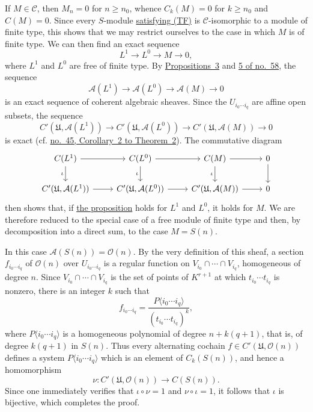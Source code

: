 If $M\in\mathcal{C}$, then $M_n=0$ for $n\geq n_0$, whence
$C_k(M)=0$ for $k\geq n_0$ and $C(M)=0$. Since every $S$-module
\hyperref[fac:III:2:no:56:def:TF]{satisfying (TF)} is
$\mathcal{C}$-isomorphic to a module of finite type,
this shows that we may restrict ourselves to the case in which $M$ is of
finite type. We can then find an exact sequence
\[
L^1\longrightarrow L^0\longrightarrow M\longrightarrow0,
\]
where $L^1$ and $L^0$ are free of finite type. By
\hyperref[fac:III:2:no:58:prop:3]{Propositions~3} and
\hyperref[fac:III:2:no:58:prop:5]{5 of no.~58}, the sequence
\label{fac:III:3:no:64:formula:sheaf-exact}
\[
\mathcal{A}(L^1)\longrightarrow\mathcal{A}(L^0)
\longrightarrow\mathcal{A}(M)\longrightarrow0
\]
is an exact sequence of coherent algebraic sheaves. Since the
$U_{i_0\cdots i_q}$ are affine open subsets, the sequence
\label{fac:III:3:no:64:formula:cochain-exact}
\[
C'(\mathfrak{U},\mathcal{A}(L^1))
\longrightarrow C'(\mathfrak{U},\mathcal{A}(L^0))
\longrightarrow C'(\mathfrak{U},\mathcal{A}(M))
\longrightarrow0
\]
is exact (cf.
\hyperref[fac:II:3:no:45:thm:2:cor:2]{no.~45, Corollary~2 to Theorem~2}).
The commutative diagram
\label{fac:III:3:no:64:diagram:iota}
\[
\begin{tikzcd}
C(L^1) \arrow[r] \arrow[d,"\iota"']
  & C(L^0) \arrow[r] \arrow[d,"\iota"']
  & C(M) \arrow[r] \arrow[d,"\iota"'] & 0 \arrow[d] \\
C'(\mathfrak{U},\mathcal{A}(L^1)) \arrow[r]
  & C'(\mathfrak{U},\mathcal{A}(L^0)) \arrow[r]
  & C'(\mathfrak{U},\mathcal{A}(M)) \arrow[r] & 0
\end{tikzcd}
\]
then shows that, if \hyperref[fac:III:3:no:64:prop:4]{the proposition}
holds for $L^1$ and $L^0$, it holds
for $M$. We are therefore reduced to the special case of a free module of
finite type and then, by decomposition into a direct sum, to the case
$M=S(n)$.

In this case $\mathcal{A}(S(n))=\mathcal{O}(n)$. By the very definition
of this sheaf, a section $f_{i_0\cdots i_q}$ of $\mathcal{O}(n)$ over
$U_{i_0\cdots i_q}$ is a regular function on
$V_{i_0}\cap\cdots\cap V_{i_q}$, homogeneous of degree $n$. Since
$V_{i_0}\cap\cdots\cap V_{i_q}$ is the set of points of $K^{r+1}$ at
which $t_{i_0}\cdots t_{i_q}$ is nonzero, there is an integer $k$ such
that
\label{fac:III:3:no:64:formula:fraction}
\[
f_{i_0\cdots i_q}
=\frac{P\langle i_0\cdots i_q\rangle}
       {(t_{i_0}\cdots t_{i_q})^k},
\]
where $P\langle i_0\cdots i_q\rangle$ is a homogeneous polynomial of
degree $n+k(q+1)$, that is, of degree $k(q+1)$ in $S(n)$. Thus every
alternating cochain
$f\in C'(\mathfrak{U},\mathcal{O}(n))$ defines a system
$P\langle i_0\cdots i_q\rangle$ which is an element of $C_k(S(n))$,
and hence a homomorphism
\label{fac:III:3:no:64:map:nu}
\[
\nu:C'(\mathfrak{U},\mathcal{O}(n))\longrightarrow C(S(n)).
\]
Since one immediately verifies that $\iota\circ\nu=1$ and
$\nu\circ\iota=1$, it follows that $\iota$ is bijective, which completes
the proof.

